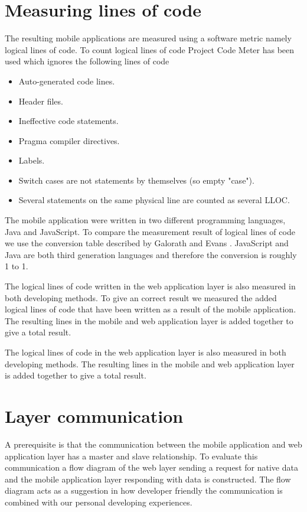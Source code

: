 \section{Measuring lines of code}\label{section-measuring-lines-of-code}
The resulting mobile applications are measured using a software metric namely logical lines of code. To count logical lines of code Project Code Meter has been used which ignores the following lines of code \cite{project-code-meter2015}

\begin{itemize}
\item Auto-generated code lines.
\item Header files.
\item Ineffective code statements.
\item Pragma compiler directives.
\item Labels.
\item Switch cases are not statements by themselves (so empty "case").
\item Several statements on the same physical line are counted as several LLOC.
\end{itemize}

The mobile application were written in two different programming languages, Java and JavaScript. To compare the measurement result of logical lines of code we use the conversion table described by Galorath and Evans \cite[p.~163]{galorath2006}. JavaScript and Java are both third generation languages and therefore the conversion is roughly 1 to 1. 

The logical lines of code written in the web application layer is also measured in both developing methods. To give an correct result we measured the added logical lines of code that have been written as a result of the mobile application. The resulting lines in the mobile and web application layer is added together to give a total result. 

The logical lines of code in the web application layer is also measured in both developing methods. The resulting lines in the mobile and web application layer is added together to give a total result. 

\section{Layer communication} \label{section-layer-communication}
A prerequisite is that the communication between the mobile application and web application layer has a master and slave relationship. To evaluate this communication a flow diagram of the web layer sending a request for native data and the mobile application layer responding with data is constructed. The flow diagram acts as a suggestion in how developer friendly the communication is combined with our personal developing experiences.